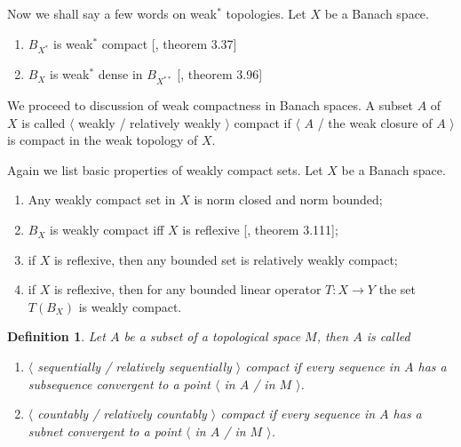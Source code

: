\documentclass[12pt]{article}
\newtheorem{definition}[theorem]{Definition}
\begin{document}
Now we shall say a few words on weak${}^*$ topologies. Let $X$ be a Banach
space.

\begin{enumerate}[label = (\roman*)]

    \item $B_{X^*}$ is weak${}^*$ compact [\cite{FabHabBanSpTh}, theorem 3.37]

    \item $B_X$ is weak${}^*$ dense in $B_{X^{**}}$ [\cite{FabHabBanSpTh},
                  theorem 3.96]

\end{enumerate}

We proceed to discussion of weak compactness in Banach spaces. A subset $A$ of
$X$ is called $\langle$ weakly / relatively weakly $\rangle$ compact if
$\langle$ $A$ / the weak closure of $A$ $\rangle$ is compact in the weak
topology of $X$.

Again we list basic properties of weakly compact sets. Let $X$ be a Banach
space.

\begin{enumerate}[label = (\roman*)]

    \item Any weakly compact set in $X$ is norm closed and norm bounded;

    \item $B_X$ is weakly compact iff $X$ is reflexive [\cite{FabHabBanSpTh},
                  theorem 3.111];

    \item if $X$ is reflexive, then any bounded set is relatively weakly compact;

    \item if $X$ is reflexive, then for any bounded linear operator $T:X\to Y$
          the set $T(B_X)$ is weakly compact.

\end{enumerate}

\begin{definition} Let $A$ be a subset of a topological space $M$, then $A$ is
    called

    \begin{enumerate}[label = (\roman*)]
        \item $\langle$ sequentially / relatively sequentially $\rangle$ compact
              if every sequence in $A$ has a subsequence convergent to a point
              $\langle$ in $A$ / in $M$ $\rangle$.

        \item $\langle$ countably / relatively countably $\rangle$ compact if
              every sequence in $A$ has a subnet convergent to a point $\langle$
              in $A$ / in $M$ $\rangle$.
    \end{enumerate}
\end{definition}
\end{document}
